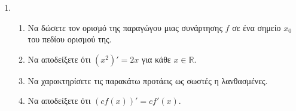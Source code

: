 \begin{enumerate}[leftmargin=0mm]
\item
\begin{enumerate}
\item Να δώσετε τον ορισμό της παραγώγου μιας συνάρτησης $ f $ σε ένα σημείο $ x_0 $ του πεδίου ορισμού της.
\item Να αποδείξετε ότι $ (x^2)'=2x $ για κάθε $ x\in\mathbb{R} $.
\item Να χαρακτηρίσετε τις παρακάτω προτάεις ως σωστές η λανθασμένες.
\item Να αποδείξετε ότι $ (cf(x))'=cf'(x) $.
\end{enumerate}


\end{enumerate}

